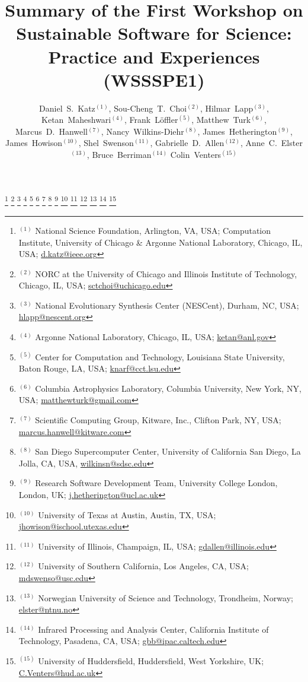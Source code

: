\documentclass[11pt, oneside]{amsart}
\newcommand{\note}[1]{ {\textcolor{red}    { #1 }}}
\begin{document}
\title[]{Summary of the First Workshop on Sustainable Software for Science: Practice and Experiences (WSSSPE1)}

\author{Daniel~S.~Katz$^{(1)}$,
Sou-Cheng~T.~Choi$^{(2)}$,
Hilmar~Lapp$^{(3)}$,
Ketan~Maheshwari$^{(4)}$,
Frank~L\"{o}ffler$^{(5)}$,
Matthew~Turk$^{(6)}$,
Marcus~D.~Hanwell$^{(7)}$,
Nancy~Wilkins-Diehr$^{(8)}$,
James~Hetherington$^{(9)}$,
James~Howison$^{(10)}$,
Shel~Swenson$^{(11)}$,
Gabrielle~D.~Allen$^{(12)}$,
Anne~C.~Elster$^{(13)}$,
Bruce~Berriman$^{(14)}$
Colin~Venters$^{(15)}$
}

\thanks{{}$^{(1)}$ National Science Foundation, Arlington, VA, USA; Computation Institute, University of Chicago \& Argonne National Laboratory, Chicago, IL, USA; \url{d.katz@ieee.org}}
%
\thanks{{}$^{(2)}$ NORC at the University of Chicago and   Illinois Institute of Technology, Chicago, IL, USA; \url{sctchoi@uchicago.edu}}
%
\thanks{{}$^{(3)}$ National Evolutionary Synthesis Center (NESCent),
  Durham, NC, USA; \url{hlapp@nescent.org}}
%
\thanks{{}$^{(4)}$ Argonne National Laboratory, Chicago, IL, USA; \url{ketan@anl.gov}}
%
\thanks{{}$^{(5)}$ Center for Computation and Technology, Louisiana State University, Baton Rouge, LA, USA; \url{knarf@cct.lsu.edu}}
%
\thanks{{}$^{(6)}$ Columbia Astrophysics Laboratory, Columbia University, New
York, NY, USA; \url{matthewturk@gmail.com}}
%
\thanks{{}$^{(7)}$ Scientific Computing Group, Kitware, Inc.,  Clifton Park, NY, USA; \url{marcus.hanwell@kitware.com}}
%
\thanks{{}$^{(8)}$ San Diego Supercomputer Center, University of California San Diego, La Jolla, CA, USA, \url{wilkinsn@sdsc.edu}}
%
\thanks{{}$^{(9)}$ Research Software Development Team, University College London, London, UK; \url {j.hetherington@ucl.ac.uk}}
%
\thanks{{}$^{(10)}$ University of Texas at Austin, Austin, TX, USA; \url{jhowison@ischool.utexas.edu}}
%
\thanks{{}$^{(11)}$ University of Illinois, Champaign, IL, USA; \url{gdallen@illinois.edu}}
%
\thanks{{}$^{(12)}$ University of Southern California, Los Angeles, CA, USA; \url{mdswenso@usc.edu}}
%
\thanks{{}$^{(13)}$ Norwegian University of Science and Technology, Trondheim, Norway; \url{elster@ntnu.no}}
%
\thanks{{}$^{(14)}$ Infrared Processing and Analysis Center, California Institute of Technology, Pasadena, CA, USA; \url{gbb@ipac.caltech.edu}}
%
\thanks{{}$^{(15)}$ University of Huddersfield, Huddersfield, West Yorkshire, UK; \url{C.Venters@hud.ac.uk}}
\end{document}

